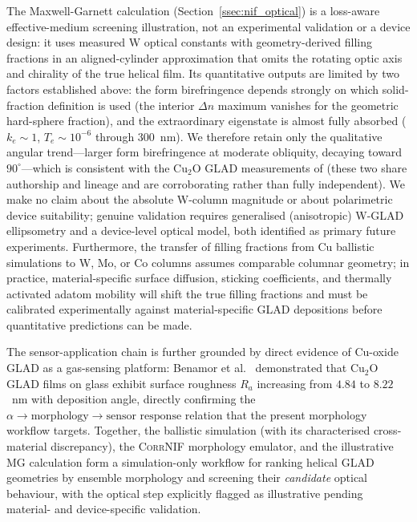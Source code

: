 \documentclass[aip,amsmath,amssymb,reprint]{revtex4-1}
\newcommand{\dang}{\ensuremath{\alpha}}
\begin{document}
The Maxwell-Garnett calculation (Section~\ref{ssec:nif_optical}) is
a loss-aware effective-medium screening illustration, not an experimental
validation or a device design: it uses measured W optical constants
\citep{palik1985} with geometry-derived filling fractions in an
aligned-cylinder approximation that omits the rotating optic axis and
chirality of the true helical film.
Its quantitative outputs are limited by two factors established above: the
form birefringence depends strongly on which solid-fraction definition is
used (the interior $\Delta n$ maximum vanishes for the geometric hard-sphere
fraction), and the extraordinary eigenstate is almost fully absorbed
($k_e \sim 1$, $T_e \sim 10^{-6}$ through \SI{300}{nm}).
We therefore retain only the qualitative angular trend---larger form
birefringence at moderate obliquity, decaying toward $90^{\circ}$---which is
consistent with the Cu$_2$O GLAD measurements of
\citet{chaffar2018,chaffar2019} (these two share authorship and lineage and
are corroborating rather than fully independent).
We make no claim about the absolute W-column magnitude or about
polarimetric device suitability; genuine validation requires generalised
(anisotropic) W-GLAD ellipsometry and a device-level optical model, both
identified as primary future experiments.
Furthermore, the transfer of filling fractions from Cu ballistic
simulations to W, Mo, or Co columns assumes comparable columnar geometry;
in practice, material-specific surface diffusion, sticking coefficients,
and thermally activated adatom mobility will shift the true filling
fractions and must be calibrated experimentally against
material-specific GLAD depositions before quantitative predictions can
be made.

The sensor-application chain is further grounded by direct evidence
of Cu-oxide GLAD as a gas-sensing platform: Benamor et al.\
\citep{benamor2026} demonstrated that Cu$_2$O GLAD films on glass
exhibit surface roughness $R_a$ increasing from $4.84$ to
$8.22$~nm with deposition angle, directly confirming the
$\dang \to \text{morphology} \to \text{sensor response}$
relation that the present morphology workflow targets.
Together, the ballistic simulation (with its characterised
cross-material discrepancy), the \textsc{CorrNIF} morphology emulator, and
the illustrative MG calculation form a simulation-only workflow for ranking
helical GLAD geometries by ensemble morphology and screening their
\emph{candidate} optical behaviour, with the optical step explicitly
flagged as illustrative pending material- and device-specific validation.
\end{document}
